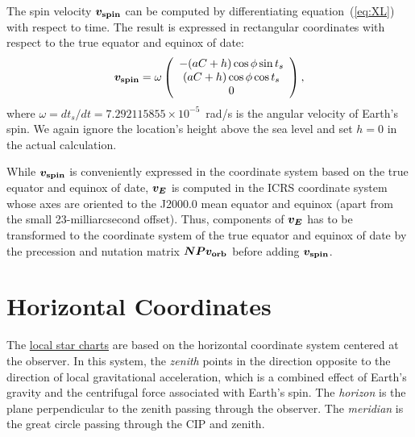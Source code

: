 \documentclass[12pt]{article}
\newcommand \beq {\begin{equation}}
\newcommand \eeq {\end{equation}}
\newcommand{\ve}[1]{\mbox{\boldmath $#1$}}
\begin{document}
The spin velocity $\ve{v_{\rm spin}}$ can be computed by differentiating 
equation~(\ref{eq:XL}) with respect to time. The result is expressed 
in rectangular coordinates with respect to the true equator and equinox of date:
\beq
  \ve{v_{\rm spin}} = \omega \left( \begin{array}{c} 
 -(aC +h) \cos \phi \sin t_s \\ (aC+h) \cos \phi \cos t_s \\ 0 \end{array} \right) ,
\label{eq:vspin}
\eeq
where $\omega=dt_s/dt = 7.292115855\times 10^{-5}$~rad/s is the angular velocity 
of Earth's spin. We again ignore the location's height above the sea level and 
set $h=0$ in the actual calculation. 

While $\ve{v_{\rm spin}}$ is conveniently expressed in the coordinate system based 
on the true equator and equinox of date, $\ve{v_E}$ is computed in 
the ICRS coordinate system whose axes are oriented to the J2000.0 mean equator 
and equinox (apart from the small 23-milliarcsecond offset). Thus, 
components of $\ve{v_E}$ has to be 
transformed to the coordinate system of the true equator and equinox of date 
by the precession and nutation matrix $\ve{N P v_{\rm orb}}$ before adding 
$\ve{v_{\rm spin}}$.

\section{Horizontal Coordinates}

The \href{../sidereal.html}{local star charts} are based on the horizontal 
coordinate system centered at the observer. In this system, the {\em zenith} 
points in the direction opposite to the direction of local gravitational 
acceleration, which is a combined effect of Earth's gravity and the centrifugal 
force associated with Earth's spin. The {\em horizon} is the plane 
perpendicular to the zenith passing through the observer. The {\em meridian} 
is the great circle passing through the CIP and zenith.
\end{document}
